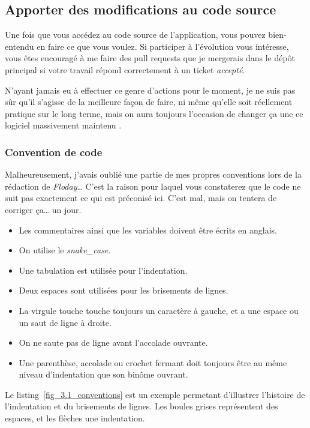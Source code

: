 \subsection{Apporter des modifications au code source}

Une fois que vous accédez au code source de l'application, vous pouvez bien-entendu en faire ce que vous voulez.
Si participer à l'évolution vous intéresse, vous êtes encouragé à me faire des pull requests que je mergerais dans le dépôt principal si votre travail répond correctement à un ticket \emph{accepté}.

N'ayant jamais eu à effectuer ce genre d'actions pour le moment, je ne suis pas sûr qu'il s'agisse de la meilleure façon de faire, ni même qu'elle soit réellement pratique sur le long terme, mais on aura toujours l'occasion de changer ça une ce logiciel massivement maintenu \Winkey.

\subsubsection{Convention de code}
Malheureusement, j'avais oublié une partie de mes propres conventions lors de la rédaction de \emph{Floday}\dots
C'est la raison pour laquel vous constaterez que le code ne suit pas exactement ce qui est préconisé ici.
C'est mal, mais on tentera de corriger ça\dots{} un jour.

\begin{itemize}
	\item Les commentaires ainsi que les variables doivent être écrits en anglais.
	\item On utilise le \emph{snake\_case}.
	\item Une tabulation est utilisée pour l'indentation.
	\item Deux espaces sont utilisées pour les brisements de lignes.
	\item La virgule touche touche toujours un caractère à gauche, et a une espace ou un saut de ligne à droite.
	\item On ne saute pas de ligne avant l'accolade ouvrante.
	\item Une parenthèse, accolade ou crochet fermant doit toujours être au même niveau d'indentation que son binôme ouvrant. 
\end{itemize}

Le listing~\ref{fig_3.1_conventions} est un exemple permetant d'illustrer l'histoire de l'indentation et du brisements de lignes.
Les boules grises représentent des espaces, et les flèches une indentation.

